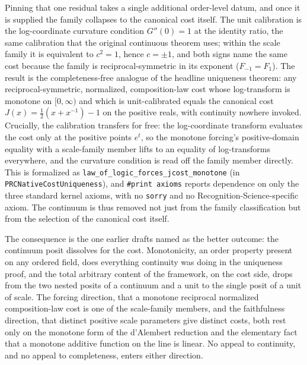 \documentclass[11pt,a4paper]{article}
\theoremstyle{definition}
\theoremstyle{remark}
\begin{document}
Pinning that one residual takes a single additional order-level datum, and once it
is supplied the family collapses to the canonical cost itself. The unit
calibration is the log-coordinate curvature condition $G''(0)=1$ at the
identity ratio, the same calibration that the original continuous theorem uses;
within the scale family it is equivalent to $c^2=1$, hence $c=\pm 1$, and both
signs name the same cost because the family is reciprocal-symmetric in its
exponent ($F_{-1}=F_{1}$). The result is the completeness-free analogue of the
headline uniqueness theorem: any reciprocal-symmetric, normalized,
composition-law cost whose log-transform is monotone on $[0,\infty)$ and which is
unit-calibrated equals the canonical cost $J(x)=\tfrac12(x+x^{-1})-1$ on the
positive reals, with continuity nowhere invoked. Crucially, the calibration
transfers for free: the log-coordinate transform evaluates the cost only at the
positive points $e^t$, so the monotone forcing's positive-domain equality with a
scale-family member lifts to an equality of log-transforms everywhere, and the
curvature condition is read off the family member directly. This is formalized as
\texttt{law\_of\_logic\_forces\_jcost\_monotone} (in
\texttt{PRCNativeCostUniqueness}), and \verb|#print axioms| reports dependence on
only the three standard kernel axioms, with no \texttt{sorry} and no
Recognition-Science-specific axiom. The continuum is thus removed not just from
the family classification but from the selection of the canonical cost itself.

The consequence is the one earlier drafts named as the better outcome: the
continuum posit dissolves for the cost. Monotonicity, an order property present on
any ordered field, does everything continuity was doing in the uniqueness proof,
and the total arbitrary content of the framework, on the cost side, drops from the
two nested posits of a continuum and a unit to the single posit of a unit of
scale. The forcing direction, that a monotone reciprocal normalized
composition-law cost is one of the scale-family members, and the faithfulness
direction, that distinct positive scale parameters give distinct costs, both rest
only on the monotone form of the d'Alembert reduction and the elementary fact that
a monotone additive function on the line is linear. No appeal to continuity, and
no appeal to completeness, enters either direction.
\end{document}
